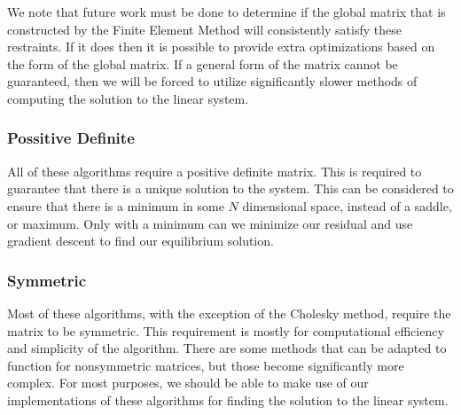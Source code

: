 \documentclass[../fem.tex]{subfile}
\begin{document}
We note that future work must be done to determine if the global matrix that is
constructed by the Finite Element Method will consistently satisfy these
restraints. If it does then it is possible to provide extra optimizations based
on the form of the global matrix. If a general form of the matrix cannot be
guaranteed, then we will be forced to utilize significantly slower methods of
computing the solution to the linear system.

%      

\subsubsection{Possitive Definite}%
\label{ssub:possitive_definite}

All of these algorithms require a positive definite matrix. This is required to
guarantee that there is a unique solution to the system. This can be considered
to ensure that there is a minimum in some $N$ dimensional space, instead of a
saddle, or maximum. Only with a minimum can we minimize our residual and use
gradient descent to find our equilibrium solution.

\subsubsection{Symmetric}%
\label{ssub:symmetric}

Most of these algorithms, with the exception of the Cholesky method, require the
matrix to be symmetric. This requirement is mostly for computational
efficiency and simplicity of the algorithm. There are some methods that can be
adapted to function for nonsymmetric matrices, but those become significantly
more complex. For most purposes, we should be able to make use of our
implementations of these algorithms for finding the solution to the linear
system.
\end{document}
